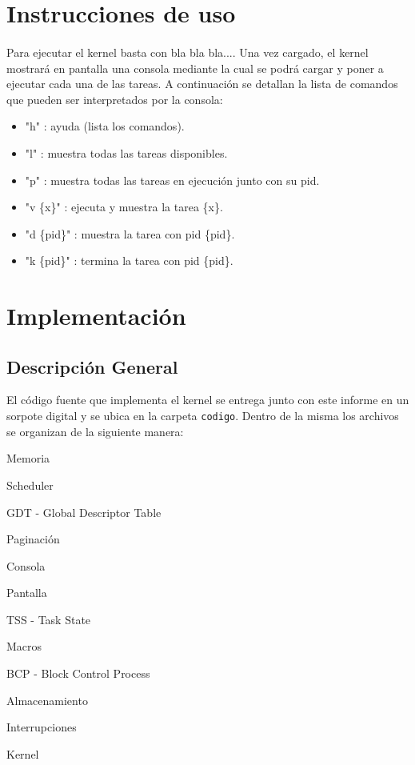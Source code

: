 \documentclass[11pt, a4paper]{article}
\begin{document}
\section{Instrucciones de uso}
\paragraph{}
Para ejecutar el kernel basta con bla bla bla.... Una vez cargado, el kernel mostrará en pantalla una consola mediante la cual se podrá cargar y poner a ejecutar cada una de las tareas. A continuación se detallan la lista de comandos que pueden ser interpretados por la consola:
\begin{itemize}
\item "h" : ayuda (lista los comandos).
\item "l" : muestra todas las tareas disponibles.
\item "p" : muestra todas las tareas en ejecuci\'on junto con su pid.
\item "v \{x\}" : ejecuta y muestra la tarea \{x\}.
\item "d \{pid\}" : muestra la tarea con pid \{pid\}.
\item "k \{pid\}" : termina la tarea con pid \{pid\}.

\end{itemize}


\section{Implementación}
\subsection{Descripción General}
El código fuente que implementa el kernel se entrega junto con este informe en un sorpote digital y se ubica en la carpeta \texttt{codigo}. Dentro de la misma los archivos se organizan de la siguiente manera:
\begin{center}
\begin{shortitemize}
\setlength{\shortitemwidth}{200pt}
\item Memoria
\item Scheduler
\item GDT - Global Descriptor Table
\item Paginación				
\item Consola
\item Pantalla
\item TSS - Task State
\item Macros
\item BCP - Block Control Process
\item Almacenamiento
\item Interrupciones							
\item Kernel
\end{shortitemize}
\end{center}		
\end{document}
